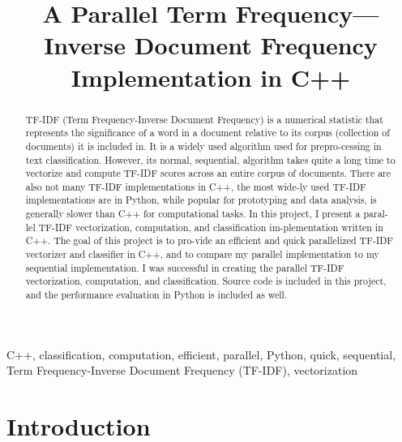 \documentclass[conference]{IEEEtran}
\begin{document}
\title{A Parallel Term Frequency---Inverse Document Frequency Implementation in C++\\

}

\author{
}

\maketitle

\begin{abstract}
    TF-IDF (Term Frequency-Inverse Document Frequency) is a numerical statistic that represents the significance of a word in a document relative to its corpus (collection of documents) it is included in. It is a widely used algorithm used for prepro-cessing in text classification. However, its normal, sequential, algorithm takes quite a long time to vectorize and compute TF-IDF scores across an entire corpus of documents. There are also not many TF-IDF implementations in C++, the most wide-ly used TF-IDF implementations are in Python,  while popular for prototyping and data analysis, is generally slower than C++ for computational tasks. In this project, I present a paral-lel TF-IDF vectorization, computation, and classification im-plementation written in C++. The goal of this project is to pro-vide an efficient and quick parallelized TF-IDF vectorizer and classifier in C++, and to compare my parallel implementation to my sequential implementation. I was successful in creating the parallel TF-IDF vectorization, computation, and classification. Source code is included in this project, and the performance evaluation in Python is included as well. 
\end{abstract}

\begin{IEEEkeywords}
    C++, classification, computation, efficient, parallel, Python, quick, sequential, Term Frequency-Inverse Document Frequency (TF-IDF), vectorization
\end{IEEEkeywords}

\section{Introduction}
\end{document}
